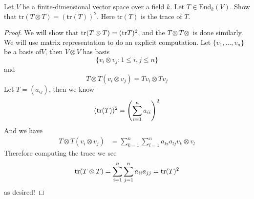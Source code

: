 \begin{prob}[S2006-Q5]
    Let \(V\) be a finite-dimensional vector space over a field \(k\). Let \(T \in \text{End}_k(V)\). Show that \(\text{tr}(T \otimes T) = (\text{tr}(T))^2\). Here \(\text{tr}(T)\) is the trace of \(T\).
\end{prob}
\begin{proof}
    We will show that $\text{tr}(T\otimes T)=(\text{tr} T)^2$, and the $T\otimes T\otimes$ is done similarly. We will use matrix representation to do an explicit computation. Let $\{v_1,\dots, v_n\}$ be a basis of$V$, then $V\otimes V$ has basis 
        \begin{equation*}
            \{v_i\otimes v_j: 1\leq i,j\leq n\}
        \end{equation*}
        and 
        \begin{equation*}
            T\otimes T(v_i\otimes v_j)=Tv_i\otimes Tv_j
        \end{equation*}
        Let $T=(a_{ij})$, then we know 
        \begin{equation*}
            (\text{tr}(T))^2=\left(\sum_{i=1}^na_{ii}\right)^2
        \end{equation*}
        And we have 
        \begin{align*}
            T\otimes T(v_i\otimes v_j)&=\sum_{k=1}^n\sum_{l=1}^na_{ki}a_{lj}v_k\otimes v_l
        \end{align*}
        Therefore computing the trace we see 
        \begin{equation*}
            \text{tr}(T\otimes T)=\sum_{i=1}^n\sum_{j=1}^na_{ii}a_{jj}=\text{tr}(T)^2
        \end{equation*}
        as desired!
\end{proof}

